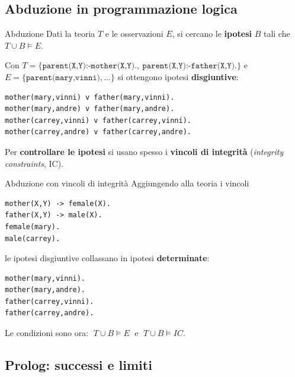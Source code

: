 
\subsection{Abduzione in programmazione logica}

\begin{Definition}[colbacktitle=red!75!black]{Abduzione}{}
  Dati la teoria $T$ e le osservazioni $E$, si cercano le \textbf{ipotesi} $B$ tali
  che $T \cup B \models E$.

  Con $T = \{\texttt{parent(X,Y):-mother(X,Y).},\ \texttt{parent(X,Y):-father(X,Y).}\}$
  e $E = \{\texttt{parent(mary,vinni)}, \dots\}$ si ottengono ipotesi
  \textbf{disgiuntive}:
\begin{lstlisting}
mother(mary,vinni) v father(mary,vinni).
mother(mary,andre) v father(mary,andre).
mother(carrey,vinni) v father(carrey,vinni).
mother(carrey,andre) v father(carrey,andre).
\end{lstlisting}
\end{Definition}

Per \textbf{controllare le ipotesi} si usano spesso i \textbf{vincoli di integrità}
(\emph{integrity constraints}, IC).

\begin{Example}{Abduzione con vincoli di integrità}{}
  Aggiungendo alla teoria i vincoli
\begin{lstlisting}
mother(X,Y) -> female(X).
father(X,Y) -> male(X).
female(mary).
male(carrey).
\end{lstlisting}
  le ipotesi disgiuntive collassano in ipotesi \textbf{determinate}:
\begin{lstlisting}
mother(mary,vinni).
mother(mary,andre).
father(carrey,vinni).
father(carrey,andre).
\end{lstlisting}
  Le condizioni sono ora: $\; T \cup B \models E \;$ e $\; T \cup B \models IC$.
\end{Example}

\subsection{Prolog: successi e limiti}


